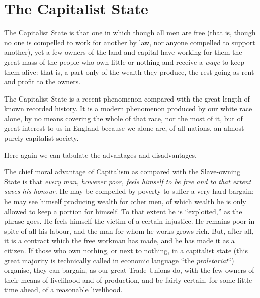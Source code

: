 \documentclass{book}
\begin{document}
\chapter*{The Capitalist State}
\label{chapter-12}
The Capitalist State is that one in which though all men are free (that is, though no one is compelled to work for another by law, nor anyone compelled to support another), yet a few owners of the land and capital have working for them the great mass of the people who own little or nothing and receive a \emph{wage} to keep them alive: that is, a part only of the wealth they produce, the rest going as rent and profit to the owners.

The Capitalist State is a recent phenomenon compared with the great length of known recorded history. It is a modern phenomenon produced by our white race alone, by no means covering the whole of that race, nor the most of it, but of great interest to us in England because we alone are, of all nations, an almost purely capitalist society.

Here again we can tabulate the advantages and disadvantages.

The chief moral advantage of Capitalism as compared with the Slave-owning State is that \emph{every man, however poor, feels himself to be free and to that extent saves his honour.} He may be compelled by poverty to suffer a very hard bargain; he may see himself producing wealth for other men, of which wealth he is only allowed to keep a portion for himself. To that extent he is “exploited,” as the phrase goes. He feels himself the victim of a certain injustice. He remains poor in spite of all his labour, and the man for whom he works grows rich. But, after all, it is a contract which the free workman has made, and he has made it as a citizen. If those who own nothing, or next to nothing, in a capitalist state (this great majority is technically called in economic language “the \emph{proletariat}“) organise, they can bargain, as our great Trade Unions do, with the few owners of their means of livelihood and of production, and be fairly certain, for some little time ahead, of a reasonable livelihood.
\end{document}
